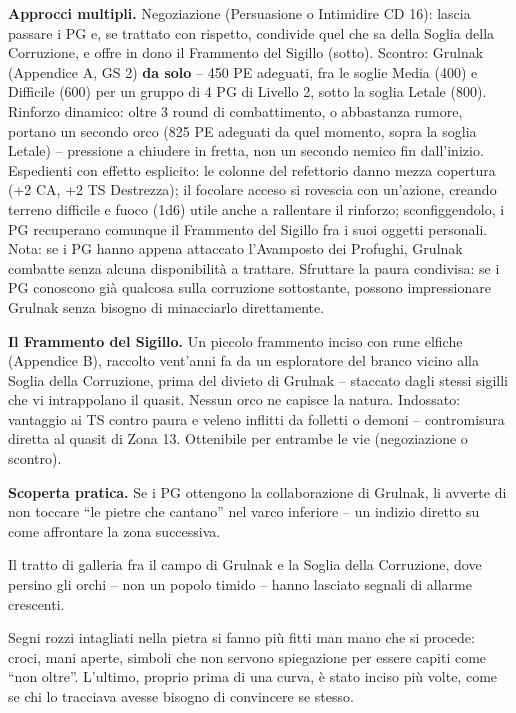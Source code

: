 \textbf{Approcci multipli.} Negoziazione (Persuasione o Intimidire CD 16): lascia passare i PG e, se trattato con rispetto, condivide quel che sa della Soglia della Corruzione, e offre in dono il Frammento del Sigillo (sotto). Scontro: Grulnak (Appendice A, GS 2) \textbf{da solo} -- 450 PE adeguati, fra le soglie Media (400) e Difficile (600) per un gruppo di 4 PG di Livello 2, sotto la soglia Letale (800). Rinforzo dinamico: oltre 3 round di combattimento, o abbastanza rumore, portano un secondo orco (825 PE adeguati da quel momento, sopra la soglia Letale) -- pressione a chiudere in fretta, non un secondo nemico fin dall'inizio. Espedienti con effetto esplicito: le colonne del refettorio danno mezza copertura (+2 CA, +2 TS Destrezza); il focolare acceso si rovescia con un'azione, creando terreno difficile e fuoco (1d6) utile anche a rallentare il rinforzo; sconfiggendolo, i PG recuperano comunque il Frammento del Sigillo fra i suoi oggetti personali. Nota: se i PG hanno appena attaccato l'Avamposto dei Profughi, Grulnak combatte senza alcuna disponibilità a trattare. Sfruttare la paura condivisa: se i PG conoscono già qualcosa sulla corruzione sottostante, possono impressionare Grulnak senza bisogno di minacciarlo direttamente.

\textbf{Il Frammento del Sigillo.} Un piccolo frammento inciso con rune elfiche (Appendice B), raccolto vent'anni fa da un esploratore del branco vicino alla Soglia della Corruzione, prima del divieto di Grulnak -- staccato dagli stessi sigilli che vi intrappolano il quasit. Nessun orco ne capisce la natura. Indossato: vantaggio ai TS contro paura e veleno inflitti da folletti o demoni -- contromisura diretta al quasit di Zona 13. Ottenibile per entrambe le vie (negoziazione o scontro).

\textbf{Scoperta pratica.} Se i PG ottengono la collaborazione di Grulnak, li avverte di non toccare ``le pietre che cantano'' nel varco inferiore -- un indizio diretto su come affrontare la zona successiva.


Il tratto di galleria fra il campo di Grulnak e la Soglia della Corruzione, dove persino gli orchi -- non un popolo timido -- hanno lasciato segnali di allarme crescenti.

\begin{DndReadAloud}[]
  Segni rozzi intagliati nella pietra si fanno più fitti man mano che si procede: croci, mani aperte, simboli che non servono spiegazione per essere capiti come ``non oltre''. L'ultimo, proprio prima di una curva, è stato inciso più volte, come se chi lo tracciava avesse bisogno di convincere se stesso.
\end{DndReadAloud}

